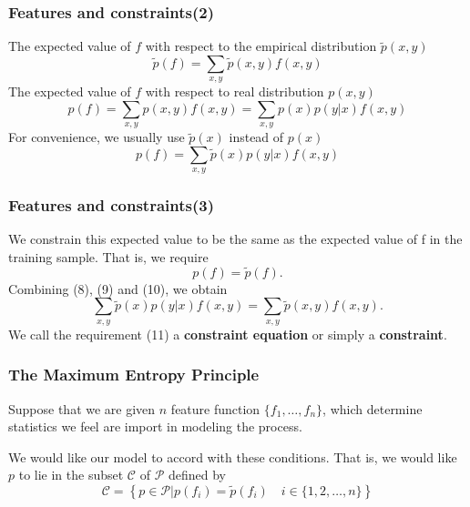 \documentclass[slidestop,compress,mathserif]{beamer}
\begin{document}
	\begin{frame}
		\frametitle{Features and constraints(2)}
		The expected value of $f$ with respect to the empirical distribution $\widetilde{p}(x,y)$
		\begin{equation}
			\widetilde{p}(f) = \sum_{x,y}\widetilde{p}(x,y)f(x,y)
		\end{equation}
		The expected value of $f$ with respect to real distribution $p(x,y)$
		\begin{equation*}
			p(f) = \sum_{x,y}p(x,y)f(x,y) = \sum_{x,y}p(x)p(y|x)f(x,y)
		\end{equation*}
		For convenience, we usually use $\widetilde{p}(x)$ instead of $p(x)$
		\begin{equation}
		p(f) = \sum_{x,y}\widetilde{p}(x)p(y|x)f(x,y)
		\end{equation}
	\end{frame}
	
	\begin{frame}
		\frametitle{Features and constraints(3)}
		We constrain this expected value to be the same as the expected value of f in the training sample. That is, we require
		\begin{equation}
			p(f) = \widetilde{p}(f). 
		\end{equation}
		Combining (8), (9) and (10), we obtain
		\begin{equation}
			\sum_{x,y}\widetilde{p}(x)p(y|x)f(x,y) = \sum_{x,y}\widetilde{p}(x,y)f(x,y).
		\end{equation}
		We call the requirement (11) a \textbf{constraint equation} or simply a \textbf{constraint}.
	\end{frame}
	
	\begin{frame}
		\frametitle{The Maximum Entropy Principle}
		Suppose that we are given $n$ feature function $\{f_1,\ldots,f_n\}$, which determine statistics we feel are import in modeling the process.
		
		We would like our model to accord with these conditions. That is, we would like $p$ to lie in the subset $\mathcal{C}$ of $\mathcal{P}$ defined by
		\begin{equation}
			\mathcal{C} = \left\{ p\in\mathcal{P} | p(f_i) = \widetilde{p}(f_i) \quad i\in \{1,2,\ldots,n\} \right\}
		\end{equation}
		\begin{figure}
		\end{figure}
	\end{frame}
	
\end{document}
